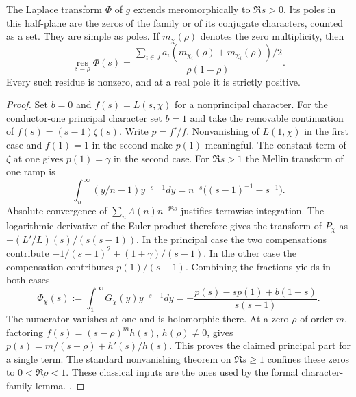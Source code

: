 \begin{proposition}\label{an:poles}
The Laplace transform \(\Phi\) of \(g\) extends meromorphically to \(\Re s>0\). Its poles in this half-plane are the zeros of the family or of its conjugate characters, counted as a set. They are simple as poles. If \(m_\chi(\rho)\) denotes the zero multiplicity, then
\begin{equation}\label{eq:residue}
 \operatorname*{res}_{s=\rho}\Phi(s)
 =\frac{\sum_{i\in J}a_i(m_{\chi_i}(\rho)+m_{\overline{\chi_i}}(\rho))/2}
             {\rho(1-\rho)} .
\end{equation}
Every such residue is nonzero, and at a real pole it is strictly positive.
\end{proposition}
\begin{proof}
Set \(b=0\) and \(f(s)=L(s,\chi)\) for a nonprincipal character. For the conductor-one principal character set \(b=1\) and take the removable continuation of \(f(s)=(s-1)\zeta(s)\). Write \(p=f'/f\). Nonvanishing of \(L(1,\chi)\) in the first case and \(f(1)=1\) in the second make \(p(1)\) meaningful. The constant term of \(\zeta\) at one gives \(p(1)=\gamma\) in the second case. For \(\Re s>1\) the Mellin transform of one ramp is
\[
 \int_n^\infty (y/n-1)y^{-s-1}dy
 =n^{-s}\big((s-1)^{-1}-s^{-1}\big).
\]
Absolute convergence of \(\sum_n\Lambda(n)n^{-\Re s}\) justifies termwise integration. The logarithmic derivative of the Euler product therefore gives the transform of \(P_\chi\) as \(- (L'/L)(s)/(s(s-1))\). In the principal case the two compensations contribute \(-1/(s-1)^2+(1+\gamma)/(s-1)\). In the other case the compensation contributes \(p(1)/(s-1)\). Combining the fractions yields in both cases
\begin{equation}\label{eq:mellin}
 \Phi_\chi(s):=\int_1^\infty G_\chi(y)y^{-s-1}dy
 =-\frac{p(s)-s p(1)+b(1-s)}{s(s-1)} .
\end{equation}
The numerator vanishes at one and is holomorphic there. At a zero \(\rho\) of order \(m\), factoring \(f(s)=(s-\rho)^m h(s)\), \(h(\rho)\ne0\), gives \(p(s)=m/(s-\rho)+h'(s)/h(s)\). This proves the claimed principal part for a single term. The standard nonvanishing theorem on \(\Re s\ge1\) confines these zeros to \(0<\Re\rho<1\). These classical inputs are the ones used by the formal character-family lemma. .


\end{proof}
